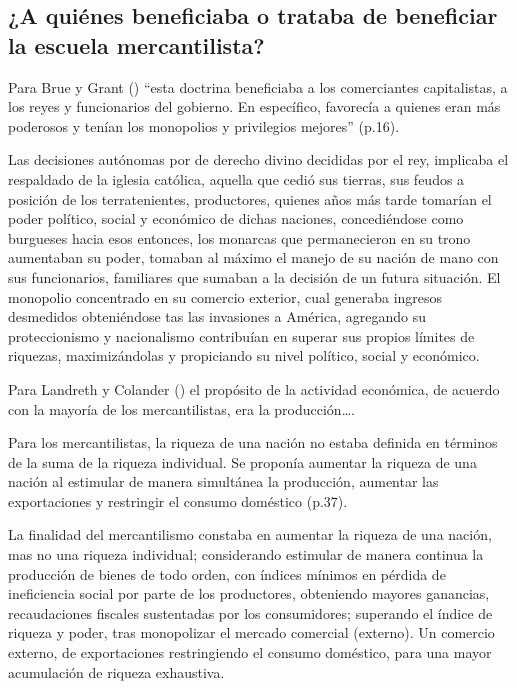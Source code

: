 \documentclass[
  stu,
  floatsintext,
  longtable,
  a4paper,
  nolmodern,
  notxfonts,
  notimes,
  12pt,
  colorlinks=true,linkcolor=blue,citecolor=blue,urlcolor=blue]{apa7}
\begin{document}
\subsection{¿A quiénes beneficiaba o trataba de beneficiar la escuela
mercantilista?}\label{a-quiuxe9nes-beneficiaba-o-trataba-de-beneficiar-la-escuela-mercantilista}

Para Brue y Grant
() ``esta
doctrina beneficiaba a los comerciantes capitalistas, a los reyes y
funcionarios del gobierno. En específico, favorecía a quienes eran más
poderosos y tenían los monopolios y privilegios mejores'' (p.16).

Las decisiones autónomas por de derecho divino decididas por el rey,
implicaba el respaldado de la iglesia católica, aquella que cedió sus
tierras, sus feudos a posición de los terratenientes, productores,
quienes años más tarde tomarían el poder político, social y económico de
dichas naciones, concediéndose como burgueses hacia esos entonces, los
monarcas que permanecieron en su trono aumentaban su poder, tomaban al
máximo el manejo de su nación de mano con sus funcionarios, familiares
que sumaban a la decisión de un futura situación. El monopolio
concentrado en su comercio exterior, cual generaba ingresos desmedidos
obteniéndose tas las invasiones a América, agregando su proteccionismo y
nacionalismo contribuían en superar sus propios límites de riquezas,
maximizándolas y propiciando su nivel político, social y económico.

Para Landreth y Colander
() el propósito
de la actividad económica, de acuerdo con la mayoría de los
mercantilistas, era la producción\ldots.

Para los mercantilistas, la riqueza de una nación no estaba definida en
términos de la suma de la riqueza individual. Se proponía aumentar la
riqueza de una nación al estimular de manera simultánea la producción,
aumentar las exportaciones y restringir el consumo doméstico (p.37).

La finalidad del mercantilismo constaba en aumentar la riqueza de una
nación, mas no una riqueza individual; considerando estimular de manera
continua la producción de bienes de todo orden, con índices mínimos en
pérdida de ineficiencia social por parte de los productores, obteniendo
mayores ganancias, recaudaciones fiscales sustentadas por los
consumidores; superando el índice de riqueza y poder, tras monopolizar
el mercado comercial (externo). Un comercio externo, de exportaciones
restringiendo el consumo doméstico, para una mayor acumulación de
riqueza exhaustiva.
\end{document}
